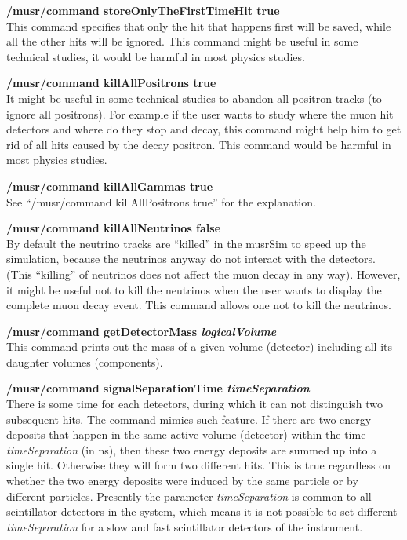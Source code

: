 \documentclass[twoside]{dis04}
\begin{document}
\begin{description}
\item{\bf /musr/command storeOnlyTheFirstTimeHit true}\\
	This command specifies that only the hit that happens first will be
	saved, while all the other hits will be ignored.
	This command might be useful in some technical studies, it would
	be harmful in most physics studies.

\item{\bf /musr/command killAllPositrons true}\\
	It might be useful in some technical studies to abandon all positron
	tracks (to ignore all positrons).  For example if the user wants
	to study where the muon hit detectors and where do they stop and
	decay, this command might help him to get rid of all hits
	caused by the decay positron.  This command would be
	harmful in most physics studies.

\item{\bf /musr/command killAllGammas true}\\
	See ``/musr/command killAllPositrons true'' for the explanation.

\item{\bf /musr/command killAllNeutrinos false}\\
	By default the neutrino tracks are ``killed'' in the musrSim to
	speed up the simulation, because
	the neutrinos anyway do not interact with the detectors.
	(This ``killing'' of neutrinos does not affect the muon decay in
	any way).
	However, it might be useful not to kill the neutrinos when the
	user wants to display the complete muon decay event.
	This command allows one not to kill the neutrinos.

\item{\bf /musr/command getDetectorMass \emph{logicalVolume}}\\
	This command prints out the mass of a given volume (detector)
	including all its daughter volumes (components).

\item{\bf /musr/command signalSeparationTime \emph{timeSeparation}}\\
	There is some time for each detectors, during which it can not distinguish
	two subsequent hits.  The command mimics such feature.
	If there are two energy deposits that happen in the same
	active volume (detector) within the time \emph{timeSeparation}
	(in ns), then these two energy deposits are summed up into
	a single hit.  Otherwise they will form two different hits.
	This is true regardless on whether the two energy deposits were
	induced by the same particle or by different particles.
	Presently the parameter \emph{timeSeparation} is common to all
	scintillator detectors in the system, which means it is not
	possible to set different \emph{timeSeparation} for a slow
	and fast scintillator detectors of the instrument.


\end{description}
\end{document}
